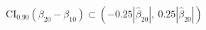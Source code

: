 \par\needspace{88pt}\begin{minipage}{\linewidth}
\begin{equation}\mathrm{CI}_{0.90}(\beta_{20}-\beta_{10})\subset\left(-0.25|\hat\beta_{20}|,\ 0.25|\hat\beta_{20}|\right)\label{eq:18}\end{equation}
\end{minipage}\par
